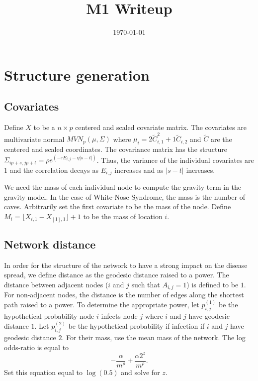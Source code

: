 \documentclass[11pt]{article}
\date{\today}
\title{M1 Writeup}
\begin{document}
\maketitle
\tableofcontents


\section{Structure generation}
\label{sec-1}

\subsection{Covariates}
\label{sec-1-1}

Define $X$ to be a $n \times p$ centered and scaled covariate matrix.
The covariates are multivariate normal $MVN_p(\mu,\Sigma)$ where
$\mu_i = 2\widetilde{C}_{i,1}^2 + 1\widetilde{C}_{i,2}$ and
$\widetilde{C}$ are the centered and scaled coordinates.  The
covariance matrix has the structure $\Sigma_{ip + s, jp + t} =
\rho e^{(-\tau  E_{i,j} - \eta |s-t|)}$.  Thus, the variance of the
individual covariates are $1$ and the correlation decays as $E_{i,j}$
increases and as $|s-t|$ increases.

We need the mass of each individual node to compute the gravity term
in the gravity model.  In the case of White-Nose Syndrome, the mass is
the number of caves.  Arbitrarily set the first covariate to be the
mass of the node.  Define $M_i = \lfloor X_{i,1} - X_{[1],1} \rfloor +
1$ to be the mass of location $i$.


\subsection{Network distance}
\label{sec-1-2}

In order for the structure of the network to have a strong impact on
the disease spread, we define distance as the geodesic distance raised
to a power.  The distance between adjacent nodes ($i$ and $j$ such
that $A_{i,j} = 1$) is defined to be $1$.  For non-adjacent nodes, the
distance is the number of edges along the shortest path raised to a
power.  To determine the appropriate power, let $p^{(1)}_{i,j}$ be the
hypothetical probability node $i$ infects node $j$ where $i$ and $j$
have geodesic distance $1$.  Let $p^{(2)}_{i,j}$ be the hypothetical
probability if infection if $i$ and $j$ have geodesic distance $2$.
For their mass, use the mean mass of the network.  The log odds-ratio
is equal to
\begin{equation*}
  - \frac{\alpha}{m^\rho} + \frac{\alpha2^z}{m^\rho}.
\end{equation*}
Set this equation equal to $\log(0.5)$ and solve for $z$.
\end{document}
